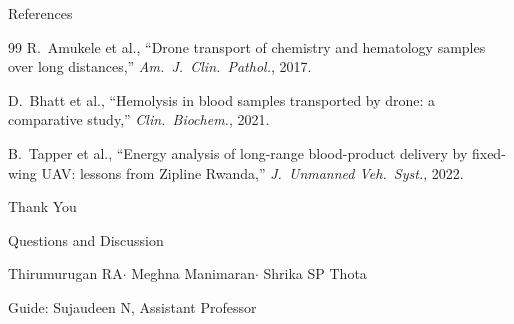 \documentclass[aspectratio=169,11pt]{beamer}
\begin{document}
\begin{frame}[allowframebreaks]{References}
\begin{thebibliography}{99}
      R.\ Amukele et al.,
      ``Drone transport of chemistry and hematology samples over long
      distances,''
      \emph{Am.\ J.\ Clin.\ Pathol.}, 2017.

      D.\ Bhatt et al.,
      ``Hemolysis in blood samples transported by drone: a comparative
      study,''
      \emph{Clin.\ Biochem.}, 2021.

      B.\ Tapper et al.,
      ``Energy analysis of long-range blood-product delivery by fixed-wing
      UAV: lessons from Zipline Rwanda,''
      \emph{J.\ Unmanned Veh.\ Syst.}, 2022.

  \end{thebibliography}
\end{frame}

\begin{frame}[plain]
  \centering
  \vfill
  {\color{UniversityBlue}\Huge Thank You}\par
  \vspace{0.5cm}
  {\Large Questions and Discussion}\par
  \vspace{0.8cm}
  {\normalsize
    Thirumurugan RA\quad$\cdot$\quad
    Meghna Manimaran\quad$\cdot$\quad
    Shrika SP Thota}\par
  \vspace{0.3cm}
  {\small Guide: Sujaudeen N, Assistant Professor}
  \vfill
\end{frame}
\end{document}
